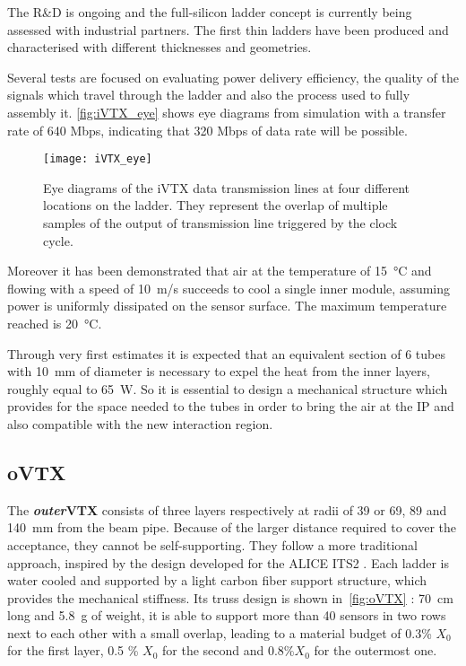 The R\&D is ongoing and the full-silicon ladder concept is currently being assessed with industrial partners. The first thin ladders have been produced and characterised with different thicknesses and geometries.

Several tests are focused on evaluating power delivery efficiency, the quality of the signals which travel through the ladder and also the process used to fully assembly it. 
\autoref{fig:iVTX_eye} shows eye diagrams from simulation with a transfer rate of 640 Mbps, indicating that 320 Mbps of data rate will be possible.

\begin{figure}[h!]
\centering
\texttt{[image: iVTX\_eye]}
\caption{Eye diagrams of the iVTX data transmission lines at four different locations on the ladder. They represent the overlap of multiple samples of the output of transmission line triggered by the clock cycle.}
\label{fig:iVTX_eye}
\end{figure}

Moreover it has been demonstrated that air at the temperature of \SI{15}{\degreeCelsius} and flowing with a speed of \SI{10}{m/s} succeeds to cool a single inner module, assuming power is uniformly dissipated on the sensor surface. The maximum temperature reached is \SI{20}{\degreeCelsius}. 

Through very first estimates it is expected that an equivalent section of 6 tubes with \SI{10}{mm} of diameter is necessary to expel the heat from the inner layers, roughly equal to \SI{65}{W}. So it is essential to design a mechanical structure which provides for the space needed to the tubes in order to bring the air at the IP and also compatible with the new interaction region.


\subsection{oVTX} \label{sec:oVTX}

The \textbf{\textit{outer}VTX} consists of three layers respectively at radii of 39 or 69, 89 and \SI{140}{mm} from the beam pipe. Because of the larger distance required to cover the acceptance, they cannot be self-supporting. They follow a more traditional approach, inspired by the design developed for the ALICE ITS2 \cite{Fantoni:2020iyr}. Each ladder is water cooled and supported by a light carbon fiber support structure, which provides the mechanical stiffness. Its truss design is shown in~\autoref{fig:oVTX} : \SI{70}{cm} long and \SI{5.8}{g} of weight, it is able to support more than 40 sensors in two rows next to each other with a small overlap, leading to a material budget of 0.3\% $X_{0}$ for the first layer, 0.5 \% $X_{0}$ for the second and 0.8\%$X_{0}$  for the outermost one.

